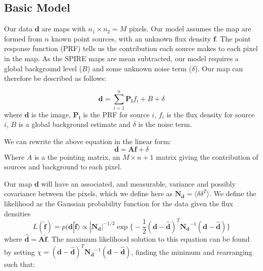 \documentclass[useAMS,usenatbib]{mn2e}
\begin{document}

\subsection{Basic Model}
Our data $\mathbf{d}$ are maps with $n_1 \times n_2 = M$ pixels. Our model assumes the map are formed from $n$ known point sources, with an unknown flux density $\mathbf{f}$. The point response function (PRF) tells us the contribution each source makes to each pixel in the map. As the SPIRE maps are mean subtracted, our model requires a global background level ($B$) and some unknown noise term ($\delta$). Our map can therefore be described as follows:

\begin{equation}
\mathbf{d} = \sum\limits_{i=1}^n \mathbf{P_i}f_i + B + \delta
\label{eq:map}
\end{equation}
where $\mathbf{d}$ is the image, $\mathbf{P_i}$ is the PRF for source $i$, $f_i$ is the flux density for source $i$, $B$ is a global background estimate and $\delta$ is the noise term.

We can rewrite the above equation in the linear form:
\begin{equation}
\mathbf{d} = \mathbf{Af} + \delta
\label{eq:map2}
\end{equation}
Where $A$ is a the pointing matrix, an $M \times n+1$ matrix giving the contribution of sources and background to each pixel.

Our map $\mathbf{d}$ will have an associated, and measurable, variance and possibly covariance between the pixels, which we define here as $\mathbf{N_d} = \langle\delta\delta^T\rangle$. We define the likelihood as the Gaussian probability function for the data given the flux densities
\begin{equation}
L(\hat{\mathbf{f}}) = p(\mathbf{d}|\hat{\mathbf{f}}) \propto |\mathbf{N_d}|^{-1/2} \exp\big\{ -\frac{1}{2}(\mathbf{d}-\hat{\mathbf{d}})^T\mathbf{N_d}^{-1}(\mathbf{d}-\hat{\mathbf{d}})\big\}\label{eq:likelihood}
\end{equation}
where $\hat{\mathbf{d}}=\mathbf{A\hat{f}}$. The maximum likelihood solution to this equation can be found by setting $\chi = (\mathbf{d}-\hat{\mathbf{d}})^T\mathbf{N_d}^{-1}(\mathbf{d}-\hat{\mathbf{d}})$, finding the minimum and rearranging such that:
\end{document}
